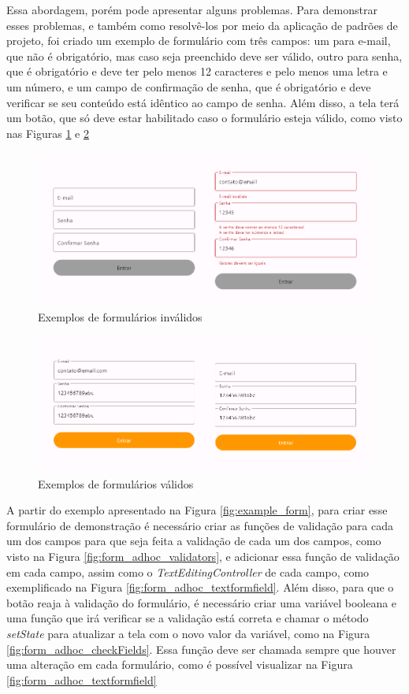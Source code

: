 \documentclass[12pt, %
openright, 
oneside, %
a4paper,    %
brazil]{facom-ufu-abntex2}
\begin{document}
Essa abordagem, porém pode apresentar alguns problemas. Para demonstrar esses problemas, e também como resolvê-los por meio da aplicação de padrões de projeto, foi criado um exemplo de formulário com três campos: um para e-mail, que não é obrigatório, mas caso seja preenchido deve ser válido, outro para senha, que é obrigatório e deve ter pelo menos 12 caracteres e pelo menos uma letra e um número, e um campo de confirmação de senha, que é obrigatório e deve verificar se seu conteúdo está idêntico ao campo de senha. Além disso, a tela terá um botão, que só deve estar habilitado caso o formulário esteja válido, como visto nas Figuras \ref{fig:form_preview_invalid} e \ref{fig:form_preview_valid}

\begin{figure}[ht]
    \centering
    \includegraphics[width=.65\textwidth]{figures/forms/form_preview_invalid.png}
    \caption{Exemplos de formulários inválidos}
    \label{fig:form_preview_invalid}
\end{figure}

\begin{figure}[ht]
    \centering
    \includegraphics[width=.65\textwidth]{figures/forms/form_preview_valid.png}
    \caption{Exemplos de formulários válidos}
    \label{fig:form_preview_valid}
\end{figure}

A partir do exemplo apresentado na Figura \ref{fig:example_form}, para criar esse formulário de demonstração é necessário criar as funções de validação para cada um dos campos para que seja feita a validação de cada um dos campos, como visto na Figura \ref{fig:form_adhoc_validators}, e adicionar essa função de validação em cada campo, assim como o \textit{TextEditingController} de cada campo, como exemplificado na Figura \ref{fig:form_adhoc_textformfield}. Além disso, para que o botão reaja à validação do formulário, é necessário criar uma variável booleana e uma função que irá verificar se a validação está correta e chamar o método \textit{setState} para atualizar a tela com o novo valor da variável, como na Figura \ref{fig:form_adhoc_checkFields}. Essa função deve ser chamada sempre que houver uma alteração em cada formulário, como é possível visualizar na Figura \ref{fig:form_adhoc_textformfield}
\end{document}
